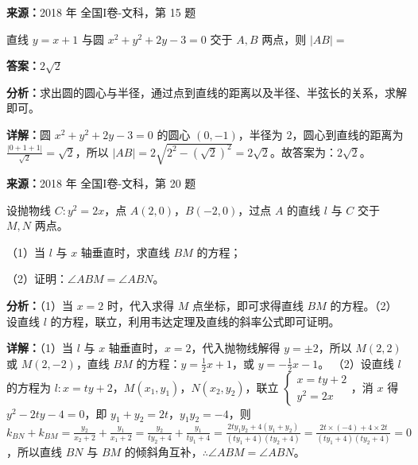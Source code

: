 \begin{question}[points=5]
\textbf{来源：}2018 年 全国I卷-文科，第 15 题\par
直线 $y=x+1$ 与圆 $x^2+y^2+2y-3=0$ 交于 $A,B$ 两点，则 $|AB|=$
\fillin[{$2\sqrt{2}$}]
\begin{solution}
\textbf{答案：}$2\sqrt{2}$

\textbf{分析：}求出圆的圆心与半径，通过点到直线的距离以及半径、半弦长的关系，求解即可。

\textbf{详解：}圆 $x^2+y^2+2y-3=0$ 的圆心 $(0,-1)$，半径为 $2$，圆心到直线的距离为 $\frac{|0+1+1|}{\sqrt{2}}=\sqrt{2}$，所以 $|AB|=2\sqrt{2^2-(\sqrt{2})^2}=2\sqrt{2}$。故答案为：$2\sqrt{2}$。
\end{solution}
\end{question}

\begin{question}[points=12]
\textbf{来源：}2018 年 全国I卷-文科，第 20 题\par
设抛物线 $C:y^2=2x$，点 $A(2,0)$，$B(-2,0)$，过点 $A$ 的直线 $l$ 与 $C$ 交于 $M,N$ 两点。

（1）当 $l$ 与 $x$ 轴垂直时，求直线 $BM$ 的方程；

（2）证明：$\angle ABM=\angle ABN$。
\begin{solution}

\textbf{分析：}（1）当 $x=2$ 时，代入求得 $M$ 点坐标，即可求得直线 $BM$ 的方程。（2）设直线 $l$ 的方程，联立，利用韦达定理及直线的斜率公式即可证明。

\textbf{详解：}（1）当 $l$ 与 $x$ 轴垂直时，$x=2$，代入抛物线解得 $y=\pm2$，所以 $M(2,2)$ 或 $M(2,-2)$，直线 $BM$ 的方程：$y=\frac{1}{2}x+1$，或 $y=-\frac{1}{2}x-1$。
（2）设直线 $l$ 的方程为 $l:x=ty+2$，$M(x_1,y_1)$，$N(x_2,y_2)$，联立 $\begin{cases} x=ty+2 \\ y^2=2x \end{cases}$，消 $x$ 得 $y^2-2ty-4=0$，即 $y_1+y_2=2t$，$y_1y_2=-4$，则 $k_{BN}+k_{BM}=\frac{y_2}{x_2+2}+\frac{y_1}{x_1+2}=\frac{y_2}{ty_2+4}+\frac{y_1}{ty_1+4}=\frac{2ty_1y_2+4(y_1+y_2)}{(ty_1+4)(ty_2+4)}=\frac{2t\times(-4)+4\times2t}{(ty_1+4)(ty_2+4)}=0$，所以直线 $BN$ 与 $BM$ 的倾斜角互补，$\therefore \angle ABM=\angle ABN$。
\end{solution}
\end{question}

